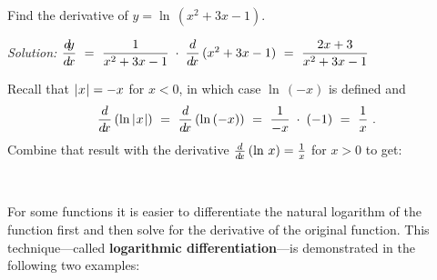 \begin{exmp}\label{exmp:derivlnx2}
 Find the derivative of $y = \ln\,\left(x^2 + 3x - 1\right)$.\vspace{1mm}
 \par\noindent\emph{Solution:} $\dfrac{d\negmedspace y}{d\!x} ~=~ \dfrac{1}{x^2 + 3x - 1} \;\cdot\;
 \dfrac{d}{d\!x}\,(x^2 + 3x - 1) ~=~ \dfrac{2x + 3}{x^2 + 3x - 1}$
\end{exmp}
\divider
\vspace{3mm}

Recall that $\lvert\mspace{1mu}x\mspace{1mu}\rvert = -x$ for $x < 0$, in which case $\ln\,(-x)$ is
defined and
\[
 \frac{d}{d\!x}\,(\ln\,\lvert\mspace{1mu}x\mspace{1mu}\rvert) ~=~ \frac{d}{d\!x}\,(\ln\,(-x)) ~=~ \frac{1}{-x} \;\cdot\; (-1) ~=~ \frac{1}{x} ~.
\]
\newpage
Combine that result with the derivative $\frac{d}{d\!x}\,(\ln\,x) = \frac{1}{x}$ for
$x > 0$ to get:

\par{}\\
\par For some functions it is easier to differentiate the natural logarithm of
the function first and then solve for the derivative of the original function.
This technique---called
\textbf{logarithmic differentiation}---is
demonstrated in the following two examples:

